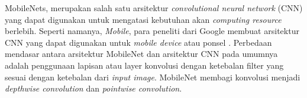 MobileNets, merupakan salah satu arsitektur \textit{convolutional neural network} (CNN) yang dapat digunakan untuk mengatasi kebutuhan akan \textit{computing resource} berlebih. Seperti namanya, \textit{Mobile}, para peneliti dari Google membuat arsitektur CNN yang dapat digunakan untuk \textit{mobile device} atau ponsel \citep{mobilnet-def}. Perbedaan mendasar antara arsitektur MobileNet dan arsitektur CNN pada umumnya adalah penggunaan lapisan atau layer konvolusi dengan ketebalan filter yang sesuai dengan ketebalan dari \textit{input image}. MobileNet membagi konvolusi menjadi \textit{depthwise convolution} dan \textit{pointwise convolution}.

